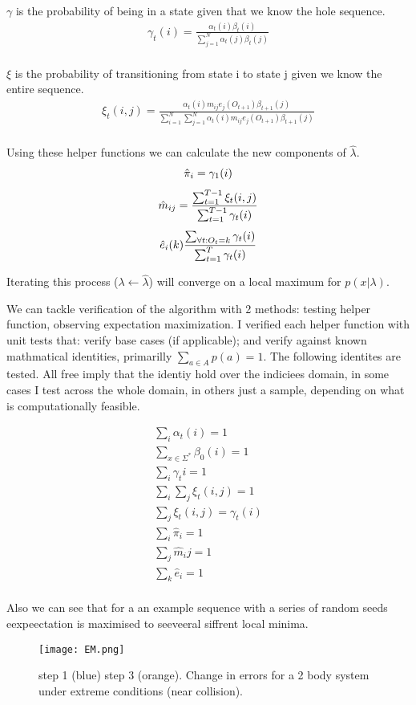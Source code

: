 $\gamma$ is the probability of being in a state given that we know the hole sequence.
\begin{gather}
    \gamma_t(i) = \frac{\alpha_t(i) \beta_t(i)}{\sum_{j=1}^N \alpha_t(j) \beta_t(j)}\\
\end{gather}

$\xi$ is the probability of transitioning from state i to state j given we know the entire sequence.
\begin{gather}
    \xi_t(i, j) = \frac{\alpha_t(i) m_{ij} e_j(O_{t+1}) \beta_{t+1}(j)}{\sum_{i=1}^N \sum_{j=1}^N \alpha_t(i) m_{ij} e_j(O_{t+1}) \beta_{t+1}(j)} \\ 
\end{gather}

Using these helper functions we can calculate the new components of $\hat{\lambda}$.
\begin{gather}
    \hat{\pi}_i = \gamma_1(i)\biggbreak
    \hat{m}_{ij} = \frac{\sum_{t=1}^{T-1} \xi_t(i,j)}{\sum_{t=1}^{T-1} \gamma_t(i)}\biggbreak
    \hat{e}_i(k) \frac{\sum_{\forall t: O_t = k} \gamma_t(i)}{\sum_{t=1}^T \gamma_t(i)}
\end{gather}

Iterating this process ($\lambda \gets \hat{\lambda}$) will converge on a local maximum for $p(x|\lambda)$.

We can tackle verification of the algorithm with 2 methods: testing helper function, observing expectation maximization. I verified each helper function with unit tests that: verify base cases (if applicable); and verify against known mathmatical identities, primarilly $\sum_{a \in A} p(a) = 1$. The following identites are tested. All free imply that the identiy hold over the indiciees domain, in some cases I test across the whole domain, in others just a sample, depending on what is computationally feasible.

\begin{gather}
    \sum_i \alpha_t(i) = 1 \\
    \sum_{x \in \Sigma^*} \beta_0(i) = 1\\
    \sum_{i} \gamma_t{i} = 1\\
    \sum_{i}\sum_{j} \xi_t(i, j)=1\\
    \sum_{j} \xi_t(i,j) = \gamma_t(i)\\
    \sum_i \hat{\pi}_i = 1\\
    \sum_j \hat{m}_ij = 1\\
    \sum_k \hat{e}_i = 1 \\
\end{gather}

Also we can see that for a an example sequence with a series of random seeds eexpeectation is maximised to seeveeral siffrent local minima.
\begin{figure}[h!]
    \begin{center}
    \texttt{[image: EM.png]}
      \caption{step 1 (blue) step 3 (orange). Change in errors for a 2 body system under extreme conditions (near collision).}
      \label{fig:convergence}
    \end{center}
    \end{figure}
